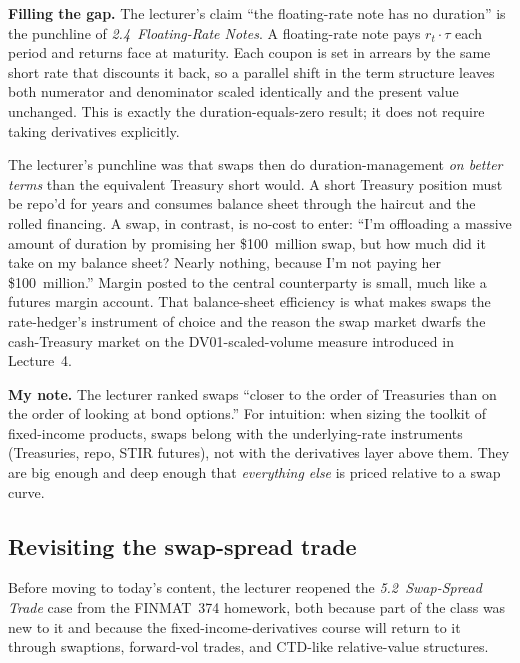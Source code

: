 \begin{tipblock}
\textbf{Filling the gap.} The lecturer's claim ``the floating-rate
note has no duration'' is the punchline of \emph{2.4~Floating-Rate
Notes}. A floating-rate note pays $r_t \cdot \tau$ each period and
returns face at maturity. Each coupon is set in arrears by the same
short rate that discounts it back, so a parallel shift in the term
structure leaves both numerator and denominator scaled identically and
the present value unchanged. This is exactly the duration-equals-zero
result; it does not require taking derivatives explicitly.
\end{tipblock}

The lecturer's punchline was that swaps then do duration-management
\emph{on better terms} than the equivalent Treasury short would. A
short Treasury position must be repo'd for years and consumes balance
sheet through the haircut and the rolled financing. A swap, in
contrast, is no-cost to enter: ``I'm offloading a massive amount of
duration by promising her \$100~million swap, but how much did it take
on my balance sheet? Nearly nothing, because I'm not paying her
\$100~million.'' Margin posted to the central counterparty is small,
much like a futures margin account. That balance-sheet efficiency is
what makes swaps the rate-hedger's instrument of choice and the reason
the swap market dwarfs the cash-Treasury market on the
DV01-scaled-volume measure introduced in Lecture~4.

\begin{checkpoint}
\textbf{My note.} The lecturer ranked swaps ``closer to the order of
Treasuries than on the order of looking at bond options.'' For
intuition: when sizing the toolkit of fixed-income products, swaps
belong with the underlying-rate instruments (Treasuries, repo, STIR
futures), not with the derivatives layer above them. They are big
enough and deep enough that \emph{everything else} is priced relative
to a swap curve.
\end{checkpoint}

\subsection{Revisiting the swap-spread trade}\label{L5-sec:swap-spread}

Before moving to today's content, the lecturer reopened the
\emph{5.2~Swap-Spread Trade} case from the FINMAT~374 homework, both
because part of the class was new to it and because the
fixed-income-derivatives course will return to it through swaptions,
forward-vol trades, and CTD-like relative-value structures.

